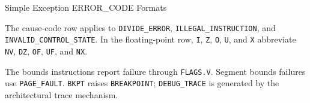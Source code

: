 \begin{manuallistedformatdiagram}{Simple Exception ERROR\_CODE Formats}
\end{manuallistedformatdiagram}
{\small
The cause-code row applies to \texttt{DIVIDE\_ERROR}, \texttt{ILLEGAL\_INSTRUCTION}, and
\texttt{INVALID\_CONTROL\_STATE}. In the floating-point row, \texttt{I}, \texttt{Z},
\texttt{O}, \texttt{U}, and \texttt{X} abbreviate \texttt{NV}, \texttt{DZ},
\texttt{OF}, \texttt{UF}, and \texttt{NX}.
\par}

The bounds instructions report failure through \texttt{FLAGS.V}. Segment bounds failures use
\texttt{PAGE\_FAULT}. \texttt{BKPT} raises \texttt{BREAKPOINT}; \texttt{DEBUG\_TRACE} is generated by the
architectural trace mechanism.
